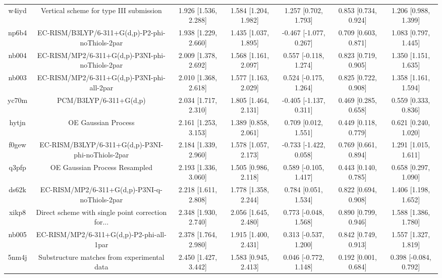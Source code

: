 \documentclass{article}
\begin{document}
\begin{center}
\begin{longtable}{|ccccccc|}
 w4iyd &            Vertical scheme for type III submission &  1.926 [1.536, 2.288] &  1.584 [1.204, 1.982] &     1.257 [0.702, 1.793] &  0.853 [0.734, 0.924] &   1.206 [0.988, 1.399] \\
 np6b4 &    EC-RISM/B3LYP/6-311+G(d,p)-P2-phi-noThiols-2par &  1.938 [1.229, 2.660] &  1.435 [1.037, 1.895] &   -0.467 [-1.077, 0.267] &  0.709 [0.603, 0.871] &   1.083 [0.797, 1.445] \\
 nb004 &    EC-RISM/MP2/6-311+G(d,p)-P3NI-phi-noThiols-2par &  2.009 [1.378, 2.692] &  1.568 [1.161, 2.097] &    0.557 [-0.118, 1.274] &  0.823 [0.719, 0.905] &   1.350 [1.151, 1.635] \\
 nb003 &         EC-RISM/MP2/6-311+G(d,p)-P3NI-phi-all-2par &  2.010 [1.368, 2.618] &  1.577 [1.163, 2.029] &    0.524 [-0.175, 1.264] &  0.825 [0.722, 0.908] &   1.358 [1.161, 1.594] \\
 yc70m &                             PCM/B3LYP/6-311+G(d,p) &  2.034 [1.717, 2.310] &  1.805 [1.464, 2.131] &   -0.405 [-1.137, 0.311] &  0.469 [0.285, 0.658] &   0.559 [0.333, 0.836] \\
 hytjn &                                OE Gaussian Process &  2.161 [1.253, 3.153] &  1.389 [0.858, 2.061] &     0.709 [0.012, 1.551] &  0.449 [0.118, 0.779] &   0.621 [0.240, 1.020] \\
 f0gew &  EC-RISM/B3LYP/6-311+G(d,p)-P3NI-phi-noThiols-2par &  2.184 [1.339, 2.960] &  1.578 [1.057, 2.173] &   -0.733 [-1.422, 0.058] &  0.769 [0.661, 0.894] &   1.291 [1.015, 1.611] \\
 q3pfp &                      OE Gaussian Process Resampled &  2.193 [1.336, 3.060] &  1.505 [0.986, 2.118] &    0.589 [-0.105, 1.417] &  0.443 [0.140, 0.785] &   0.658 [0.297, 1.090] \\
 ds62k &      EC-RISM/MP2/6-311+G(d,p)-P3NI-q-noThiols-2par &  2.218 [1.611, 2.808] &  1.778 [1.358, 2.244] &     0.784 [0.051, 1.534] &  0.822 [0.694, 0.908] &   1.406 [1.198, 1.652] \\
 xikp8 &  Direct scheme with single point correction for... &  2.348 [1.930, 2.740] &  2.056 [1.645, 2.480] &    0.773 [-0.048, 1.568] &  0.890 [0.799, 0.946] &   1.588 [1.386, 1.780] \\
 nb005 &           EC-RISM/MP2/6-311+G(d,p)-P2-phi-all-1par &  2.378 [1.764, 2.980] &  1.915 [1.400, 2.431] &    0.313 [-0.537, 1.200] &  0.842 [0.749, 0.913] &   1.557 [1.327, 1.819] \\
 5nm4j &        Substructure matches from experimental data &  2.450 [1.427, 3.442] &  1.583 [0.945, 2.413] &    0.046 [-0.772, 1.148] &  0.192 [0.001, 0.684] &  0.398 [-0.084, 0.792] \\

\end{longtable}
\end{center}
\end{document}
